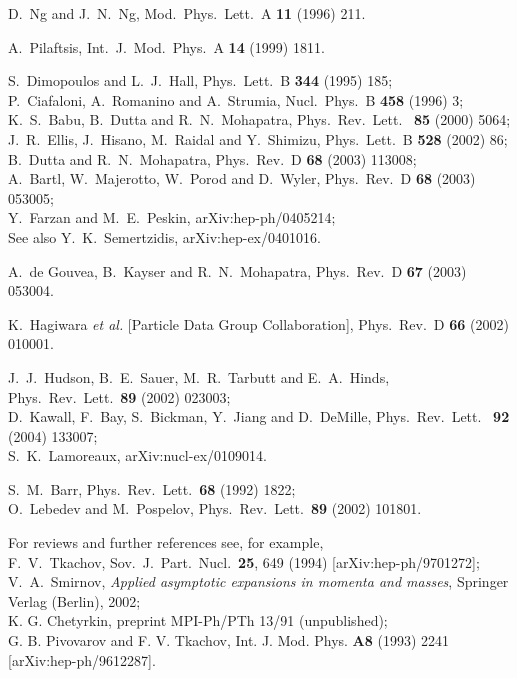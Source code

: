 \begin{thebibliography}{99}
 D.~Ng and J.~N.~Ng,
Mod.\ Phys.\ Lett.\ A {\bf 11} (1996) 211.

A.~Pilaftsis,
Int.\ J.\ Mod.\ Phys.\ A {\bf 14} (1999) 1811.


 S.~Dimopoulos and L.~J.~Hall,
Phys.\ Lett.\ B {\bf 344} (1995) 185;\\
 P.~Ciafaloni, A.~Romanino and A.~Strumia, Nucl.\ Phys.\ B {\bf 458} (1996) 3;\\
K.~S.~Babu, B.~Dutta and R.~N.~Mohapatra, Phys.\ Rev.\ Lett.\ {\bf
85} (2000) 5064;\\
 J.~R.~Ellis, J.~Hisano, M.~Raidal and Y.~Shimizu, Phys.\ Lett.\ B {\bf 528}
(2002) 86;\\
 B.~Dutta and R.~N.~Mohapatra, Phys.\ Rev.\ D {\bf 68} (2003) 113008;\\
A.~Bartl, W.~Majerotto, W.~Porod and D.~Wyler, Phys.\ Rev.\ D {\bf
68} (2003) 053005;\\
 Y.~Farzan and M.~E.~Peskin, arXiv:hep-ph/0405214;\\
 See also Y.~K.~Semertzidis,
arXiv:hep-ex/0401016.




 A.~de Gouvea, B.~Kayser and R.~N.~Mohapatra,
Phys.\ Rev.\ D {\bf 67} (2003) 053004.



 K.~Hagiwara {\it et al.}  [Particle Data Group Collaboration],
Phys.\ Rev.\ D {\bf 66} (2002) 010001.

 J.~J.~Hudson, B.~E.~Sauer, M.~R.~Tarbutt and E.~A.~Hinds,
Phys.\ Rev.\ Lett.\  {\bf 89} (2002) 023003;\\
 D.~Kawall, F.~Bay,
S.~Bickman, Y.~Jiang and D.~DeMille, Phys.\ Rev.\ Lett.\  {\bf
92} (2004) 133007;\\
 S.~K.~Lamoreaux, arXiv:nucl-ex/0109014.

 S.~M.~Barr,
Phys.\ Rev.\ Lett.\  {\bf 68} (1992) 1822; \\
O.~Lebedev and M.~Pospelov, Phys.\ Rev.\ Lett.\  {\bf 89} (2002)
101801.


For reviews and further references see, for example,\\
F.~V.~Tkachov,
Sov.\ J.\ Part.\ Nucl.\  {\bf 25}, 649 (1994)
[arXiv:hep-ph/9701272];
\\
V.~A.~Smirnov, {\em Applied asymptotic expansions in momenta and
masses}, Springer Verlag (Berlin), 2002;
\\
K. G. Chetyrkin, preprint MPI-Ph/PTh 13/91 (unpublished);
\\
G. B. Pivovarov and F. V. Tkachov, Int. J. Mod. Phys. {\bf A8}
(1993) 2241 [arXiv:hep-ph/9612287].

\end{thebibliography}

